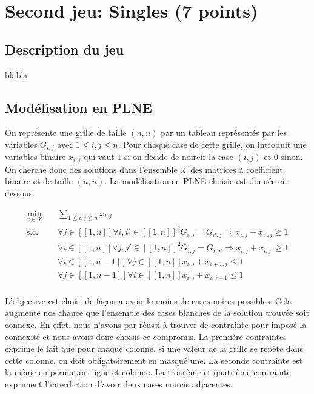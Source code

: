 \documentclass[a4paper,12pt,titlepage,leqno]{article}
\begin{document}
\section{Second jeu: Singles (7 points) }

\subsection{Description du jeu}
blabla
\subsection{Modélisation en PLNE}

On représente une grille de taille $(n,n)$ par un tableau représentés par les variables $G_{i,j}$ avec $1\leq i,j \leq n$. Pour chaque case de cette grille, on introduit une variables binaire $x_{i,j}$ qui vaut $1$ si on décide de noircir la case $(i,j)$ et $0$ sinon. On cherche donc des solutions dans l'ensemble $\mathcal{X}$ des matrices à coefficient binaire et de taille $(n,n)$.
La modélisation en PLNE choisie est donnée ci-dessous.

\begin{equation}\label{eq::modele}
\begin{aligned}
\min_{x\in\mathcal{X}} &\quad \sum_{1\leq i,j \leq n} x_{i,j}\\
\text{s.c.} &\quad \forall j\in[\![1,n]\!] \forall i,i' \in [\![1,n]\!]^2 G_{i,j}=G_{i',j} \Rightarrow x_{i,j} + x_{i',j} \geq 1\\
&\quad \forall i\in[\![1,n]\!] \forall j,j' \in [\![1,n]\!]^2 G_{i,j}=G_{i,j'} \Rightarrow x_{i,j} + x_{i,j'} \geq 1\\
&\quad \forall i\in[\![1,n-1]\!] \forall j\in[\![1,n]\!] x_{i,j} + x_{i+1,j} \leq 1\\
&\quad \forall j\in[\![1,n-1]\!] \forall i\in[\![1,n]\!] x_{i,j} + x_{i,j+1} \leq 1\\
\end{aligned}
\end{equation}

L'objective est choisi de façon a avoir le moins de cases noires possibles. Cela augmente nos chance que l'ensemble des cases blanches de la solution trouvée soit connexe. En effet, nous n'avons par réussi à trouver de contrainte pour imposé la connexité et nous avons donc choisis ce compromis.
\newline La première contraintes exprime le fait que pour chaque colonne, si une valeur de la grille se répète dans cette colonne, on doit obligatoirement en masqué une. La seconde contrainte est la même en permutant ligne et colonne.
\newline La troisième et quatrième contrainte expriment l'interdiction d'avoir deux cases noircis adjacentes.
\end{document}
